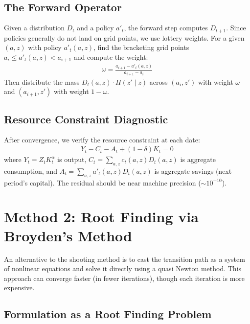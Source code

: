 \documentclass[12pt]{article}
\begin{document}
\subsection{The Forward Operator}

Given a distribution $D_t$ and a policy $a'_t$, the forward step computes $D_{t+1}$. Since policies generally do not land on grid points, we use lottery weights. For a given $(a, z)$ with policy $a'_t(a, z)$, find the bracketing grid points $a_i \leq a'_t(a, z) < a_{i+1}$ and compute the weight:
\begin{align}
    \omega = \frac{a_{i+1} - a'_t(a, z)}{a_{i+1} - a_i} \label{eq:lottery}
\end{align}
Then distribute the mass $D_t(a, z) \cdot \Pi(z' \mid z)$ across $(a_i, z')$ with weight $\omega$ and $(a_{i+1}, z')$ with weight $1 - \omega$.

\subsection{Resource Constraint Diagnostic}

After convergence, we verify the resource constraint at each date:
\begin{align}
    Y_t - C_t - A_t + (1 - \delta) K_t = 0 \label{eq:rc}
\end{align}
where $Y_t = Z_t K_t^\alpha$ is output, $C_t = \sum_{a,z} c_t(a,z) D_t(a,z)$ is aggregate consumption, and $A_t = \sum_{a,z} a'_t(a,z) D_t(a,z)$ is aggregate savings (next period's capital). The residual should be near machine precision ($\sim 10^{-10}$).


\section{Method 2: Root Finding via Broyden's Method}
\label{sec:root_finding}

An alternative to the shooting method is to cast the transition path as a system of nonlinear equations and solve it directly using a quasi Newton method. This approach can converge faster (in fewer iterations), though each iteration is more expensive.

\subsection{Formulation as a Root Finding Problem}
\end{document}
